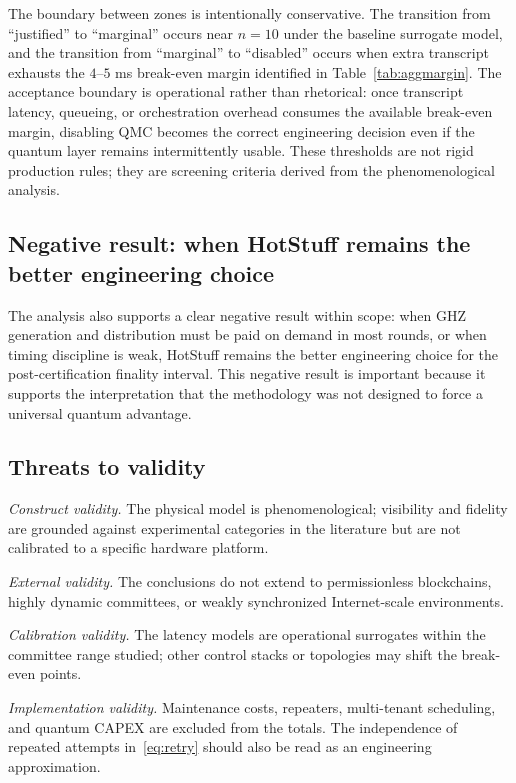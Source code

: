 \documentclass{ieeeaccess}
\begin{document}
The boundary between zones is intentionally conservative. The transition from ``justified'' to ``marginal'' occurs near $n=10$ under the baseline surrogate model, and the transition from ``marginal'' to ``disabled'' occurs when extra transcript exhausts the $4$--$5$ ms break-even margin identified in Table~\ref{tab:aggmargin}. The acceptance boundary is operational rather than rhetorical: once transcript latency, queueing, or orchestration overhead consumes the available break-even margin, disabling QMC becomes the correct engineering decision even if the quantum layer remains intermittently usable. These thresholds are not rigid production rules; they are screening criteria derived from the phenomenological analysis.

\subsection{Negative result: when HotStuff remains the better engineering choice}
The analysis also supports a clear negative result within scope: when GHZ generation and distribution must be paid on demand in most rounds, or when timing discipline is weak, HotStuff remains the better engineering choice for the post-certification finality interval. This negative result is important because it supports the interpretation that the methodology was not designed to force a universal quantum advantage.

\subsection{Threats to validity}
\textit{Construct validity.} The physical model is phenomenological; visibility and fidelity are grounded against experimental categories in the literature but are not calibrated to a specific hardware platform.

\textit{External validity.} The conclusions do not extend to permissionless blockchains, highly dynamic committees, or weakly synchronized Internet-scale environments.

\textit{Calibration validity.} The latency models are operational surrogates within the committee range studied; other control stacks or topologies may shift the break-even points.

\textit{Implementation validity.} Maintenance costs, repeaters, multi-tenant scheduling, and quantum CAPEX are excluded from the totals. The independence of repeated attempts in~\eqref{eq:retry} should also be read as an engineering approximation.
\end{document}
